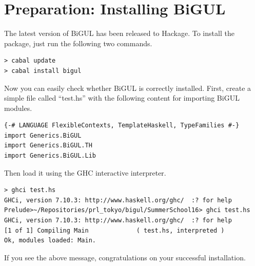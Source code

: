 \section{Preparation: Installing BiGUL}

The latest version of BiGUL has been released to Hackage. 
To install the package, just run the following two commands.
\begin{verbatim}
> cabal update
> cabal install bigul
\end{verbatim}

Now you can easily check whether BiGUL is correctly installed.
First, create a simple file called ``test.hs'' with the following 
content for importing BiGUL modules.
\begin{verbatim}
{-# LANGUAGE FlexibleContexts, TemplateHaskell, TypeFamilies #-}
import Generics.BiGUL
import Generics.BiGUL.TH
import Generics.BiGUL.Lib
\end{verbatim}
Then load it using the GHC interactive interpreter.
\begin{verbatim}
> ghci test.hs
GHCi, version 7.10.3: http://www.haskell.org/ghc/  :? for help
Prelude>~/Repositories/prl_tokyo/bigul/SummerSchool16> ghci test.hs
GHCi, version 7.10.3: http://www.haskell.org/ghc/  :? for help
[1 of 1] Compiling Main             ( test.hs, interpreted )
Ok, modules loaded: Main.
\end{verbatim}

If you see the above message, congratulations on your successful installation.

